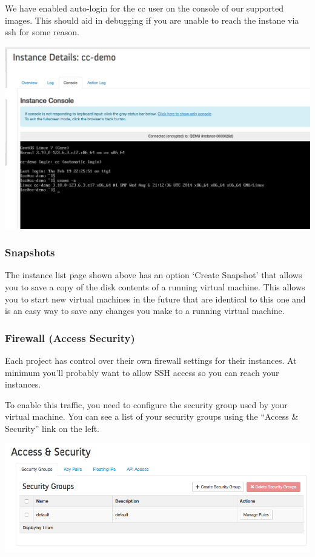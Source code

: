 We have enabled auto-login for the cc user on the console of our
supported images. This should aid in debugging if you are unable to
reach the instane via ssh for some reason.

\includegraphics[width=0.8\columnwidth]{images/chameleon/openstack_alamo_console.png}

\subsubsection{Snapshots}\label{snapshots}

The instance list page shown above has an option `Create Snapshot' that
allows you to save a copy of the disk contents of a running virtual
machine. This allows you to start new virtual machines in the future
that are identical to this one and is an easy way to save any changes
you make to a running virtual machine.

\subsubsection{Firewall (Access Security)}\label{firewall-access-security}

Each project has control over their own firewall settings for their
instances. At minimum you'll probably want to allow SSH access so you
can reach your instances.

To enable this traffic, you need to configure the security group used by
your virtual machine. You can see a list of your security groups using
the ``Access \& Security'' link on the left.

\includegraphics[width=0.8\columnwidth]{images/chameleon/openstack_alamo_security_groups.png}

